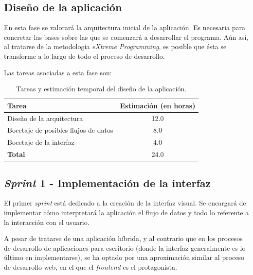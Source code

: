 \subsection{Diseño de la aplicación} \label{sub:appdesign}

En esta fase se valorará la arquitectura inicial de la aplicación. Es necesaria para concretar las bases sobre las que se comenzará a desarrollar el programa. Aún así, al tratarse de la metodología \textit{eXtreme Programming}, es posible que ésta se transforme a lo largo de todo el proceso de desarrollo.\sn

Las tareas asociadas a esta fase son:\sn

\begin{table}[ht]
    \begin{center}
        \begin{tabular}{| l | c |}
            \hline
            \textbf{Tarea} & \textbf{Estimación} (en horas) \\
            \hline
            Diseño de la arquitectura               & 12.0 \\ \hline
            Bocetaje de posibles flujos de datos    & 8.0 \\ \hline
            Bocetaje de la interfaz                 & 4.0 \\ \hline
            \textbf{Total}                          & 24.0 \\ \hline
        \end{tabular}
    \end{center}
    \caption{Tareas y estimación temporal del diseño de la aplicación.}
    \label{tab:phase3}
\end{table}

\subsection{\textit{Sprint} 1 - Implementación de la interfaz} \label{sub:sprint1}

El primer \textit{sprint} está dedicado a la creación de la interfaz visual. Se encargará de implementar cómo interpretará la aplicación el flujo de datos y todo lo referente a la interacción con el usuario.\sn

A pesar de tratarse de una aplicación híbrida, y al contrario que en los procesos de desarrollo de aplicaciones para escritorio (donde la interfaz generalmente es lo último en implementarse), se ha optado por una aproximación similar al proceso de desarrollo web, en el que el \textit{frontend} es el protagonista.\n

